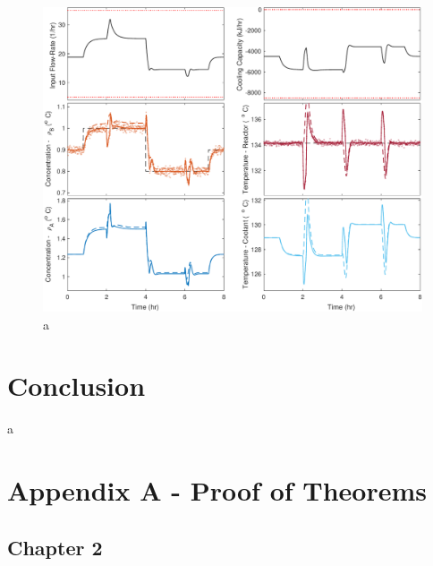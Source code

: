 \documentclass[a4paper,11pt]{book}
\numberwithin{figure}{chapter}
\numberwithin{equation}{chapter}
\numberwithin{table}{chapter}
\theoremstyle{definition}
\begin{document}
\begin{figure}[ht] \centering
	\includegraphics[width=\textwidth]{chapter7/lqgi02}
	\caption{a}
	\label{fig:lqgi02}
\end{figure}	

\clearpage
\chapter{Conclusion}

a

\clearpage
{}




\clearpage
{}
\chapter*{Appendix A - Proof of Theorems}

\section*{Chapter 2}
\end{document}
